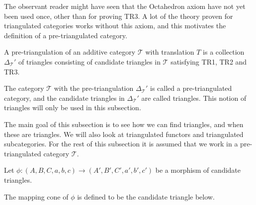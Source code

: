     The observant reader might have seen that the Octahedron axiom have not yet been used once, other than for proving TR3. A lot of the theory proven for triangulated categories works without this axiom, and this motivates the definition of a pre-triangulated category.

    \begin{definition}
        A pre-triangulation of an additive category $\mathcal{T}$ with translation $T$ is a collection $\Delta_{\mathcal{T}}'$ of triangles consisting of candidate triangles in $\mathcal{T}$ satisfying TR1, TR2 and TR3.

        The category $\mathcal{T}$ with the pre-triangulation $\Delta_{\mathcal{T}}'$ is called a pre-triangulated category, and the candidate triangles in $\Delta_{\mathcal{T}}'$ are called  triangles. This notion of triangles will only be used in this subsection.
    \end{definition}

     The main goal of this subsection is to see how we can find  triangles, and when these are triangles. We will also look at triangulated functors and triangulated subcategories. For the rest of this subsection it is assumed that we work in a pre-triangulated category $\mathcal{T}$.

    \begin{definition}
        Let $\phi : (A,B,C,a,b,c) \rightarrow (A',B',C',a',b',c')$ be a morphism of candidate triangles.
        \begin{center}
        \end{center}
        The mapping cone of $\phi$ is defined to be the candidate triangle below.
        \begin{center}
        \end{center}
    \end{definition}

